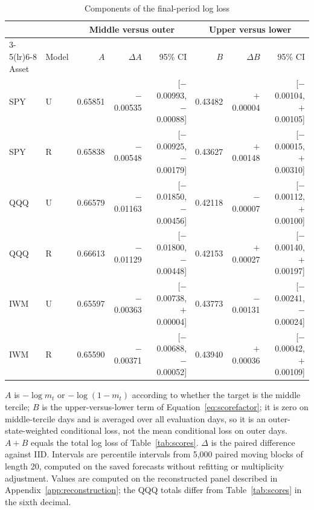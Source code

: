 \begin{table}[!htbp]\centering\small\setlength{\tabcolsep}{7pt}
\caption{Components of the final-period log loss}\label{tab:components}
\footnotesize\setlength{\tabcolsep}{4pt}\begin{tabular}{llrrrrrr}\toprule
 & & \multicolumn{3}{c}{Middle versus outer} & \multicolumn{3}{c}{Upper versus lower}\\ \cmidrule(lr){3-5}\cmidrule(lr){6-8}
Asset & Model & $A$ & $\Delta A$ & 95\% CI & $B$ & $\Delta B$ & 95\% CI\\\midrule
SPY & U & 0.65851 & $-$0.00535 & [$-$0.00993, $-$0.00088] & 0.43482 & $+$0.00004 & [$-$0.00104, $+$0.00105]\\
SPY & R & 0.65838 & $-$0.00548 & [$-$0.00925, $-$0.00179] & 0.43627 & $+$0.00148 & [$-$0.00015, $+$0.00310]\\
QQQ & U & 0.66579 & $-$0.01163 & [$-$0.01850, $-$0.00456] & 0.42118 & $-$0.00007 & [$-$0.00112, $+$0.00100]\\
QQQ & R & 0.66613 & $-$0.01129 & [$-$0.01800, $-$0.00448] & 0.42153 & $+$0.00027 & [$-$0.00140, $+$0.00197]\\
IWM & U & 0.65597 & $-$0.00363 & [$-$0.00738, $+$0.00004] & 0.43773 & $-$0.00131 & [$-$0.00241, $-$0.00024]\\
IWM & R & 0.65590 & $-$0.00371 & [$-$0.00688, $-$0.00052] & 0.43940 & $+$0.00036 & [$-$0.00042, $+$0.00109]\\
\bottomrule\end{tabular}
\par\smallskip\parbox{0.98\linewidth}{\footnotesize $A$ is $-\log m_t$ or $-\log(1-m_t)$ according to whether the target is the middle tercile; $B$ is the upper-versus-lower term of Equation~\eqref{eq:scorefactor}; it is zero on middle-tercile days and is averaged over all evaluation days, so it is an outer-state-weighted conditional loss, not the mean conditional loss on outer days. $A+B$ equals the total log loss of Table~\ref{tab:scores}. $\Delta$ is the paired difference against IID. Intervals are percentile intervals from 5,000 paired moving blocks of length 20, computed on the saved forecasts without refitting or multiplicity adjustment. Values are computed on the reconstructed panel described in Appendix~\ref{app:reconstruction}; the QQQ totals differ from Table~\ref{tab:scores} in the sixth decimal.}
\end{table}
